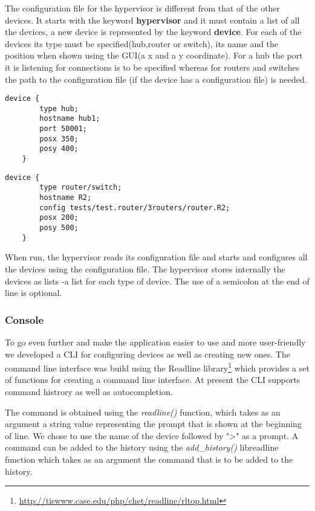 {{\begin{itemize}
The configuration file for the hypervisor is different from that of the other devices. It starts with the keyword \textbf{hypervisor} and it must contain a list of all the devices, a new device is represented by the keyword \textbf{device}. For each of the devices its type must be specified(hub,router or switch), its name and the position when shown using the GUI(a x and a y coordinate). For a hub the port it is listening for connections is to be specified whereas for routers and switches the path to the configuration file (if the device has a configuration file) is needed.    
\lstset{language=zsh,caption=Listing a Hub in hypervisor configuration file,label=lst:hy-config-file}
\begin{lstlisting}
device {
		type hub;
		hostname hub1;
		port 50001;
		posx 350;
		posy 400;
	}
\end{lstlisting}
\lstset{language=zsh,caption=Listing a Router/Switch in hypervisor configuration file,label=lst:hy-config-file}
\begin{lstlisting}
device {
		type router/switch;
		hostname R2;
		config tests/test.router/3routers/router.R2;
		posx 200;
		posy 500;
	}
\end{lstlisting}
When run, the hypervisor reads its configuration file and starts and configures all the devices using the configuration file.
The hypervisor stores internally the devices as lists -a list for each type of device. 
The use of a semicolon at the end of line is optional.  
\subsubsection*{Console}
\label{subsubsec:impl-console}
To go even further and make the application easier to use and more user-friendly we developed a CLI for configuring devices as well as creating new ones. The command line interface was build using the Readline library\footnote{\url{http://tiswww.case.edu/php/chet/readline/rltop.html}} which provides a set of functions for creating a command line interface. At present the CLI supports command histrory as well as autocompletion. 

The command is obtained using the \textit{readline()} function, which takes as an argument a string value representing the prompt that is shown at the beginning of line. We chose to use the name of the device followed by ">" as a prompt. A command can be added to the history using the \textit{add_history()} libreadline function which takes as an argument the command that is to be added to the history.


\end{itemize}}}
